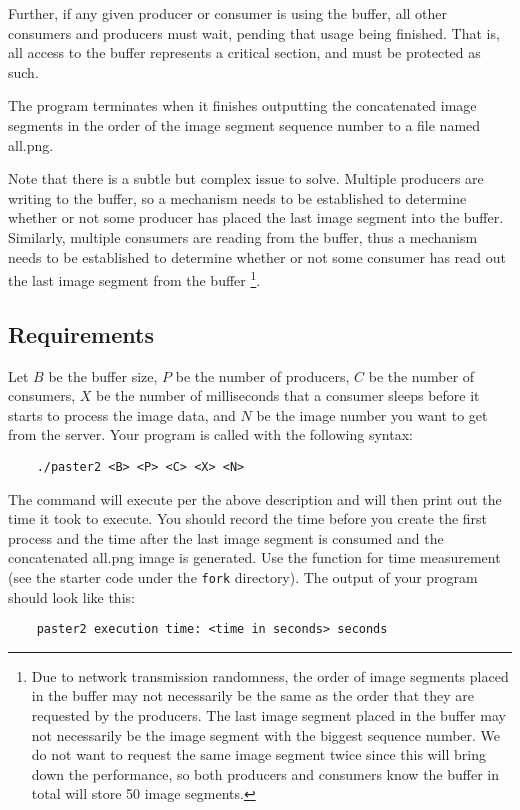 Further, if any given producer or consumer is using the buffer, all other consumers and producers must wait, pending that usage being finished.  That is, all access to the buffer represents a critical section, and must be protected as such.

The program terminates when it finishes outputting the concatenated image segments in the order of the image segment sequence number to a file named all.png.

Note that there is a subtle but complex issue to solve. Multiple producers are writing to the buffer, so a mechanism needs to be established to determine whether or not some producer has placed the last image segment into the buffer. Similarly, multiple consumers are reading from the buffer, thus a mechanism needs to be established to determine whether or not some consumer has read out the last image segment from the buffer
\footnote{Due to network transmission randomness, the order of image segments placed in the buffer may not necessarily be the same as the order that they are requested by the producers. The last image segment placed in the buffer may not necessarily be the image segment with the biggest sequence number. We do not want to request the same image segment twice since this will bring down the performance, so both producers and consumers know the buffer in total will store 50 image segments.}. 

\subsection*{Requirements}

Let
$B$ be the buffer size,  
$P$ be the number of producers,
$C$ be the number of consumers,
$X$ be the number of milliseconds that a consumer sleeps before it starts to process the image data, and
$N$ be the image number you want to get from the server.
Your program is called with the following syntax:
\begin{verbatim}
    ./paster2 <B> <P> <C> <X> <N>
\end{verbatim}

The command will execute per the above description and will then print out the time it took to execute. You should record the time before you create the first process and the time after the last image segment is consumed and the concatenated all.png image is generated. Use the  function for time measurement (see the starter code under the \verb+fork+ directory). 
The output of your program should look like this:
\begin{verbatim}
    paster2 execution time: <time in seconds> seconds
\end{verbatim}



